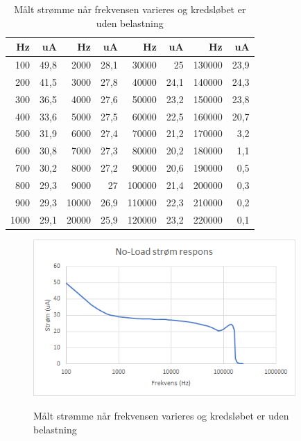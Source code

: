 \begin{table}[H]
\centering
\begin{tabular}{| r | r || r | r || r | r || r | r |}
    \hline
    \textbf{Hz} & \textbf{uA} & \textbf{Hz} & \textbf{uA} & \textbf{Hz} & \textbf{uA} & \textbf{Hz} & \textbf{uA}\\ \hline
    100 & 49,8 & 2000 & 28,1 & 30000 & 25 & 130000 & 23,9  \\ \hline
    200 & 41,5 & 3000 & 27,8 & 40000 & 24,1 & 140000 & 24,3  \\ \hline
    300 & 36,5 & 4000 & 27,6 & 50000 & 23,2 & 150000 & 23,8  \\ \hline
    400 & 33,6 & 5000 & 27,5 & 60000 & 22,5 & 160000 & 20,7  \\ \hline
    500 & 31,9 & 6000 & 27,4 & 70000 & 21,2 & 170000 & 3,2  \\ \hline
    600 & 30,8 & 7000 & 27,3 & 80000 & 20,2 & 180000 & 1,1  \\ \hline
    700 & 30,2 & 8000 & 27,2 & 90000 & 20,6 & 190000 & 0,5  \\ \hline
    800 & 29,3 & 9000 & 27 & 100000 & 21,4 &  200000 & 0,3  \\ \hline
    900 & 29,3 & 10000 & 26,9 & 110000 & 22,3 &  210000 & 0,2   \\ \hline
    1000 & 29,1 & 20000 & 25,9 & 120000 & 23,2 &  220000 & 0,1  \\ \hline
\end{tabular}
    \caption{Målt strømme når frekvensen varieres og kredsløbet er uden belastning}
    \label{table:frekvensernoload2}
\end{table} 



\begin{figure}[H]
\centering
{\includegraphics[width=10cm]
{Figure/testopstilling1fumlenoloadgraf}}
\caption{Målt strømme når frekvensen varieres og kredsløbet er uden belastning}
\label{fig:testopstilling1fumlenoloadgraf}
\end{figure}



